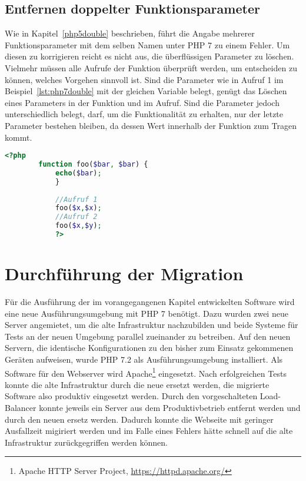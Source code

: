     \subsection{Entfernen doppelter Funktionsparameter}
    Wie in Kapitel~\ref{php5double} beschrieben, führt die Angabe mehrerer Funktionsparameter mit dem selben Namen unter \ac{PHP} 7 zu einem Fehler.
    Um diesen zu korrigieren reicht es nicht aus, die überflüssigen Parameter zu löschen. Vielmehr müssen alle Aufrufe der Funktion überprüft werden, 
    um entscheiden zu können, welches Vorgehen sinnvoll ist. Sind die Parameter wie in Aufruf 1 im Beispiel~\ref{lst:php7double} mit der gleichen Variable 
    belegt, genügt das Löschen eines Parameters in der Funktion und im Aufruf. Sind die Parameter jedoch unterschiedlich belegt, darf, um die Funktionalität 
    zu erhalten, nur der letzte Parameter bestehen bleiben, da dessen Wert innerhalb der Funktion zum Tragen kommt.
    
    \begin{lstlisting}[language=php, caption={Beispiel der Nutzung von preg\_replace\_callback}, label={lst:php7double}]
        <?php
        function foo($bar, $bar) {
            echo($bar);
            }
            
            //Aufruf 1
            foo($x,$x);
            //Aufruf 2
            foo($x,$y);
            ?>
        \end{lstlisting}
                
\section{Durchführung der Migration}
Für die Ausführung der im vorangegangenen Kapitel entwickelten Software wird eine neue Ausführungsumgebung mit \ac{PHP} 7 benötigt. Dazu wurden zwei neue 
Server angemietet, um die alte Infrastruktur nachzubilden und beide Systeme für Tests an der neuen Umgebung parallel zueinander zu betreiben. Auf den neuen 
Servern, die identische Konfigurationen zu den bisher zum Einsatz gekommenen Geräten aufweisen, wurde \ac{PHP} 7.2 als Ausführungsumgebung installiert. 
Als Software für den Webserver wird Apache\footnote{Apache HTTP Server Project, \url{https://httpd.apache.org/}} eingesetzt. Nach erfolgreichen Tests konnte die 
alte Infrastruktur durch die neue ersetzt werden, die migrierte Software also produktiv eingesetzt werden. Durch den vorgeschalteten Load-Balancer konnte jeweils 
ein Server aus dem Produktivbetrieb entfernt werden und durch den neuen ersetz werden. Dadurch konnte die Webseite mit geringer Ausfallzeit migiriert werden und 
im Falle eines Fehlers hätte schnell auf die alte Infrastruktur zurückgegriffen werden können.

